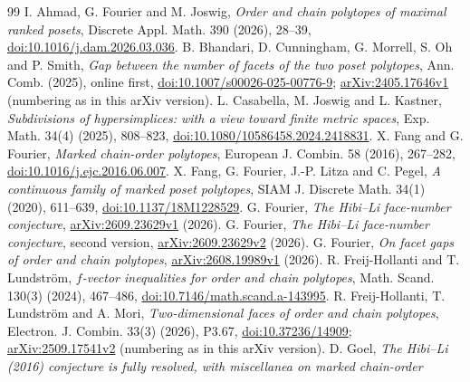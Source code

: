 \documentclass[11pt]{article}
\theoremstyle{definition}
\theoremstyle{remark}
\begin{document}
\begin{footnotesize}
\begin{thebibliography}{99}
\setlength{\itemsep}{0pt}\setlength{\parskip}{0pt}
 I. Ahmad, G. Fourier and M. Joswig,
\emph{Order and chain polytopes of maximal ranked posets},
Discrete Appl. Math. 390 (2026), 28--39, \href{https://doi.org/10.1016/j.dam.2026.03.036}{doi:10.1016/j.dam.2026.03.036}.
 B. Bhandari, D. Cunningham, G. Morrell, S. Oh and P. Smith,
\emph{Gap between the number of facets of the two poset polytopes},
Ann. Comb. (2025), online first,
\href{https://doi.org/10.1007/s00026-025-00776-9}{doi:10.1007/s00026-025-00776-9};
\href{https://arxiv.org/abs/2405.17646v1}{arXiv:2405.17646v1} (numbering as in this arXiv version).
 L. Casabella, M. Joswig and L. Kastner,
\emph{Subdivisions of hypersimplices: with a view toward finite metric
spaces}, Exp. Math. 34(4) (2025), 808--823, \href{https://doi.org/10.1080/10586458.2024.2418831}{doi:10.1080/10586458.2024.2418831}.
 X. Fang and G. Fourier, \emph{Marked chain-order polytopes},
European J. Combin. 58 (2016), 267--282, \href{https://doi.org/10.1016/j.ejc.2016.06.007}{doi:10.1016/\allowbreak j.ejc.2016.06.007}.
 X. Fang, G. Fourier, J.-P. Litza and C. Pegel, \emph{A
continuous family of marked poset polytopes}, SIAM J. Discrete Math.
34(1) (2020), 611--639, \href{https://doi.org/10.1137/18M1228529}{doi:10.1137/18M1228529}.
 G. Fourier, \emph{The Hibi--Li face-number conjecture},
\href{https://arxiv.org/abs/2609.23629v1}{arXiv:2609.23629v1} (2026).
 G. Fourier, \emph{The Hibi--Li face-number conjecture}, second version,
\href{https://arxiv.org/abs/2609.23629v2}{arXiv:2609.23629v2} (2026).
 G. Fourier, \emph{On facet gaps of order and chain
polytopes}, \href{https://arxiv.org/abs/2608.19989v1}{arXiv:2608.19989v1}
(2026).
 R. Freij-Hollanti and T. Lundstr\"om,
\emph{$f$-vector inequalities for order and chain polytopes},
Math. Scand. 130(3) (2024), 467--486, \href{https://doi.org/10.7146/math.scand.a-143995}{doi:10.7146/math.scand.a-143995}.
 R. Freij-Hollanti, T. Lundstr\"om and A. Mori,
\emph{Two-dimensional faces of order and chain polytopes},
Electron. J. Combin. 33(3) (2026), P3.67, \href{https://doi.org/10.37236/14909}{doi:10.37236/14909};
\href{https://arxiv.org/abs/2509.17541v2}{arXiv:2509.17541v2}
(numbering as in this arXiv version).
 D. Goel, \emph{The Hibi--Li \textup{(2016)}
conjecture is fully resolved, with miscellanea on marked chain-order
}
\end{thebibliography}
\end{footnotesize}
\end{document}
